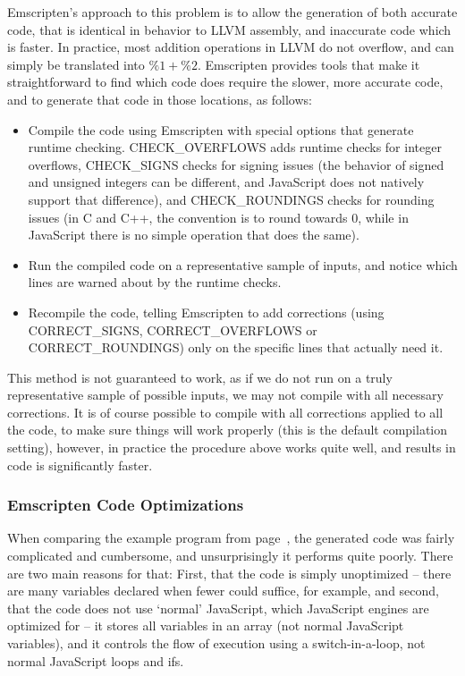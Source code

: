 \documentclass[preprint,10pt]{sigplanconf}
\begin{document}
Emscripten's approach to this problem is to allow the generation of both accurate code,
that is identical in behavior to LLVM assembly, and inaccurate code which is
faster. In practice, most addition operations in LLVM do not overflow,
and can simply be translated into $\%1 + \%2$. Emscripten
provides tools that make it straightforward to find which code does require
the slower, more accurate code, and to generate that code in those locations, as follows:
\begin{itemize}
\item Compile the code using Emscripten with special options that generate runtime checking.
      CHECK\_OVERFLOWS adds runtime checks for integer overflows, CHECK\_SIGNS
      checks for signing issues (the behavior of signed and unsigned integers can
      be different, and JavaScript does not natively support that difference), and
      CHECK\_ROUNDINGS checks for rounding issues (in C and C++, the convention is
      to round towards 0, while in JavaScript there is no simple operation that does
      the same).
\item Run the compiled code on a representative sample of inputs, and notice which
      lines are warned about by the runtime checks.
\item Recompile the code, telling Emscripten to add corrections (using CORRECT\_SIGNS, CORRECT\_OVERFLOWS
      or CORRECT\_ROUNDINGS) only on the specific lines that actually need it.
\end{itemize}

This method is not guaranteed to work, as if we do not run on a truly representative
sample of possible inputs, we may not compile with all necessary corrections. It is
of course possible to compile with all corrections applied to all the code, to make
sure things will work properly (this is the default compilation setting), however, in
practice the procedure above works quite well, and results in code is significantly faster.

\subsubsection{Emscripten Code Optimizations}
\label{sec:codeopt}

When comparing the example program from page~\pageref{code:example},
the generated code was fairly complicated
and cumbersome, and unsurprisingly it performs quite poorly. There
are two main reasons for that: First, that the code is simply
unoptimized -- there are many variables declared when fewer could
suffice, for example, and second, that the code does not use `normal'
JavaScript, which JavaScript engines are optimized for -- it
stores all variables in an array (not normal JavaScript variables),
and it controls the flow of execution using a switch-in-a-loop, not
normal JavaScript loops and ifs.
\end{document}

